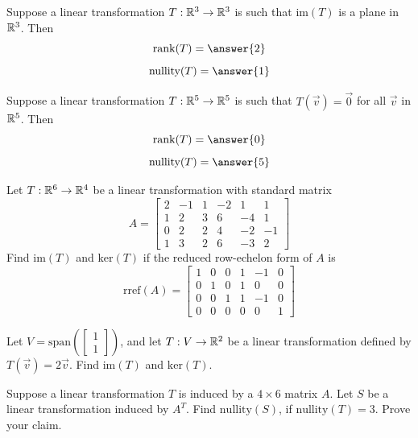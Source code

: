 \documentclass{ximera}
\begin{document}
\begin{problem}\label{prob:ranknullityT4}
Suppose a linear transformation $T:\mathbb{R}^3\rightarrow \mathbb{R}^3$ is such that $\mbox{im}(T)$ is a plane in $\mathbb{R}^3$.  Then
$$\mbox{rank}(T)=\answer{2}$$ $$\mbox{nullity}(T)=\answer{1}$$
\end{problem}

\begin{problem}\label{prob:ranknullityT5}
Suppose a linear transformation $T:\mathbb{R}^5\rightarrow \mathbb{R}^5$ is such that $T(\vec{v})=\vec{0}$ for all $\vec{v}$ in $\mathbb{R}^5$.  Then
$$\mbox{rank}(T)=\answer{0}$$ $$\mbox{nullity}(T)=\answer{5}$$
\end{problem}

\begin{problem}\label{prob:findimkergivenrref} Let $T:\mathbb{R}^6\rightarrow \mathbb{R}^4$ be a linear transformation with standard matrix
$$A=\begin{bmatrix}2&-1&1&-2&1&1\\1&2&3&6&-4&1\\0&2&2&4&-2&-1\\1&3&2&6&-3&2\end{bmatrix}$$
Find $\mbox{im}(T)$ and $\mbox{ker}(T)$ if the reduced row-echelon form of $A$ is 
$$\text{rref}(A)=\begin{bmatrix}1&0&0&1&-1&0\\0&1&0&1&0&0\\0&0&1&1&-1&0\\0&0&0&0&0&1\end{bmatrix}$$
\end{problem}

\begin{problem}\label{prob:findimageandkernellintrans} Let $V=\mbox{span}\left(\begin{bmatrix}1\\1\end{bmatrix}\right)$, and let $T:V\rightarrow \mathbb{R}^2$ be a linear transformation defined by 
$T(\vec{v})=2\vec{v}$.  Find $\mbox{im}(T)$ and $\mbox{ker}(T)$.
\end{problem}

\begin{problem}\label{prob:ranknullitytrans}
Suppose a linear transformation $T$ is induced by a $4\times 6$ matrix $A$.  Let $S$ be a linear transformation induced by $A^T$.  Find $\mbox{nullity}(S)$, if $\mbox{nullity}(T)=3$.  Prove your claim.
\end{problem}
\end{document}
